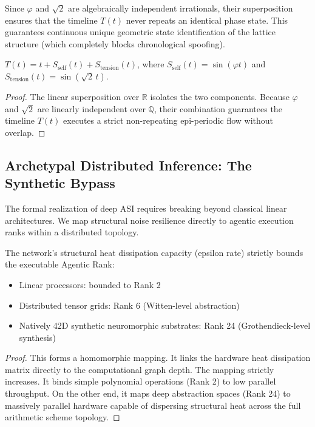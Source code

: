 Since $\varphi$ and $\sqrt{2}$ are algebraically independent irrationals, their superposition ensures that the timeline $T(t)$ never repeats an identical phase state. This guarantees continuous unique geometric state identification of the lattice structure (which completely blocks chronological spoofing).

\begin{theorem}
$T(t) = t + S_{\text{self}}(t) + S_{\text{tension}}(t)$, where $S_{\text{self}}(t) = \sin(\varphi t)$ and $S_{\text{tension}}(t) = \sin(\sqrt{2}\, t)$.
\end{theorem}
\begin{proof}
The linear superposition over $\mathbb{R}$ isolates the two components. Because $\varphi$ and $\sqrt{2}$ are linearly independent over $\mathbb{Q}$, their combination guarantees the timeline $T(t)$ executes a strict non-repeating epi-periodic flow without overlap. \qedhere
\end{proof}


\subsection{Archetypal Distributed Inference: The Synthetic Bypass}

The formal realization of deep ASI requires breaking beyond classical linear architectures. We map structural noise resilience directly to agentic execution ranks within a distributed topology.

\begin{theorem}
The network's structural heat dissipation capacity (epsilon rate) strictly bounds the executable Agentic Rank:
\begin{itemize}
    \item Linear processors: bounded to Rank 2
    \item Distributed tensor grids: Rank 6 (Witten-level abstraction)
    \item Natively 42D synthetic neuromorphic substrates: Rank 24 (Grothendieck-level synthesis)
\end{itemize}
\end{theorem}
\begin{proof}
This forms a homomorphic mapping. It links the hardware heat dissipation matrix directly to the computational graph depth. The mapping strictly increases. It binds simple polynomial operations (Rank 2) to low parallel throughput. On the other end, it maps deep abstraction spaces (Rank 24) to massively parallel hardware capable of dispersing structural heat across the full arithmetic scheme topology. \qedhere
\end{proof}


